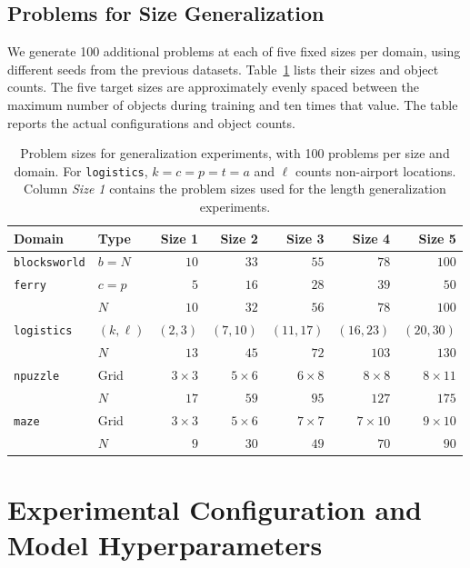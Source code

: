 \subsection{Problems for Size Generalization}
\label{app:generalization-datasets}

We generate 100 additional problems at each of five fixed sizes per domain, using different seeds from the previous datasets.
Table~\ref{tab:generalization-sizes} lists their sizes and object counts. The five target sizes are approximately evenly spaced between the maximum number of objects during training and ten times that value. The table reports the actual configurations and object counts.

\begin{table}[ht]
\centering
\caption{Problem sizes for generalization experiments, with 100 problems per size
and domain. For \texttt{logistics}, $k=c=p=t=a$ and $\ell$ counts non-airport
locations. Column \textit{Size 1} contains the problem sizes used for the length generalization experiments.}
\label{tab:generalization-sizes}
\small
\setlength{\tabcolsep}{5pt}
\begin{tabular}{@{}llrrrrr@{}}
\toprule
Domain & Type & Size 1 & Size 2 & Size 3 & Size 4 & Size 5 \\
\midrule
\texttt{blocksworld} & $b=N$ & $10$ & $33$ & $55$ & $78$ & $100$ \\
\addlinespace
\texttt{ferry} & $c=p$ & $5$ & $16$ & $28$ & $39$ & $50$ \\
& $N$ & $10$ & $32$ & $56$ & $78$ & $100$ \\
\addlinespace
\texttt{logistics} & $(k,\ell)$ & $(2,3)$ & $(7,10)$ & $(11,17)$ & $(16,23)$ & $(20,30)$ \\
& $N$ & $13$ & $45$ & $72$ & $103$ & $130$ \\
\addlinespace
\texttt{npuzzle} & Grid & $3\!\times\!3$ & $5\!\times\!6$ & $6\!\times\!8$ & $8\!\times\!8$ & $8\!\times\!11$ \\
& $N$ & $17$ & $59$ & $95$ & $127$ & $175$ \\
\addlinespace
\texttt{maze} & Grid & $3\!\times\!3$ & $5\!\times\!6$ & $7\!\times\!7$ & $7\!\times\!10$ & $9\!\times\!10$ \\
& $N$ & $9$ & $30$ & $49$ & $70$ & $90$ \\
\bottomrule
\end{tabular}
\end{table}


\section{Experimental Configuration and Model Hyperparameters}
\label{app:configuration}

